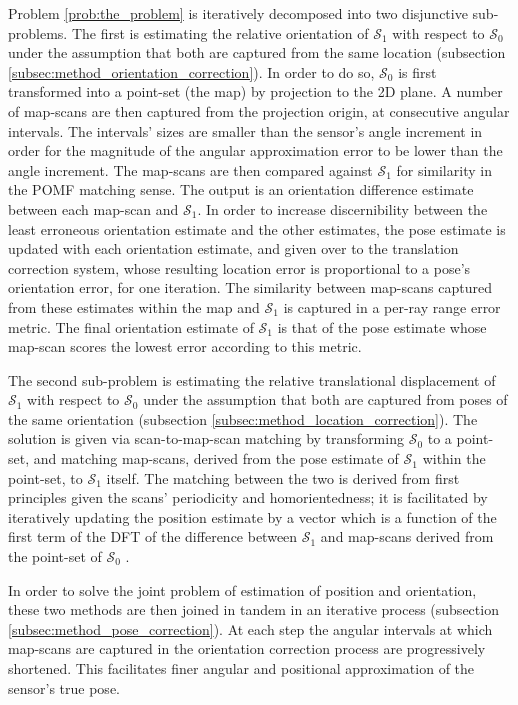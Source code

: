 Problem \ref{prob:the_problem} is iteratively decomposed into two disjunctive
sub-problems. The first is estimating the relative orientation of
$\mathcal{S}_1$ with respect to $\mathcal{S}_0$ under the assumption that both
are captured from the same location (subsection
\ref{subsec:method_orientation_correction}). In order to do so, $\mathcal{S}_0$ is
first transformed into a point-set (the map) by projection to the 2D plane. A
number of map-scans are then captured from the projection origin, at
consecutive angular intervals. The intervals' sizes are smaller than the
sensor's angle increment in order for the magnitude of the angular
approximation error to be lower than the angle increment.  The map-scans are
then compared against $\mathcal{S}_1$ for similarity in the POMF matching
sense. The output is an orientation difference estimate between each map-scan
and $\mathcal{S}_1$. In order to increase discernibility between the least
erroneous orientation estimate and the other estimates, the pose estimate is
updated with each orientation estimate, and given over to the translation
correction system, whose resulting location error is proportional to a
pose's orientation error, for one iteration. The similarity between map-scans
captured from these estimates within the map and $\mathcal{S}_1$ is captured in
a per-ray range error metric. The final orientation estimate of $\mathcal{S}_1$
is that of the pose estimate whose map-scan scores the lowest error according
to this metric.

The second sub-problem is estimating the relative translational displacement of
$\mathcal{S}_1$ with respect to $\mathcal{S}_0$ under the assumption that both
are captured from poses of the same orientation (subsection
\ref{subsec:method_location_correction}). The solution is given via
scan-to-map-scan matching by transforming $\mathcal{S}_0$ to a point-set, and
matching map-scans, derived from the pose estimate of $\mathcal{S}_1$ within
the point-set, to $\mathcal{S}_1$ itself. The matching between the two is
derived from first principles given the scans' periodicity and homorientedness;
it is facilitated by iteratively updating the position estimate by a vector
which is a function of the first term of the DFT of the difference between
$\mathcal{S}_1$ and map-scans derived from the point-set of $\mathcal{S}_0$
\cite{Filotheou2022}.

In order to solve the joint problem of estimation of position and orientation,
these two methods are then joined in tandem in an iterative process (subsection
\ref{subsec:method_pose_correction}). At each step the angular intervals at
which map-scans are captured in the orientation correction process are
progressively shortened. This facilitates finer angular and positional
approximation of the sensor's true pose.

